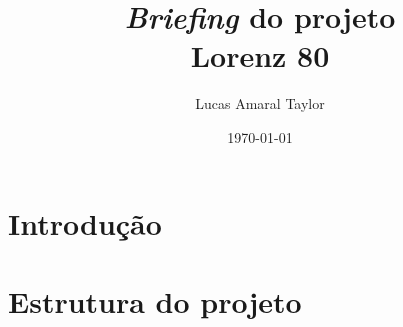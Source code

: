 \documentclass[12pt]{article}
\title{\textit{Briefing} do projeto \\ \large{Lorenz 80}}
\author{Lucas Amaral Taylor}
\date{\today}
\begin{document}
\maketitle
\section{Introdução}

\section{Estrutura do projeto}


\newpage


\nocite{*}


\end{document}
